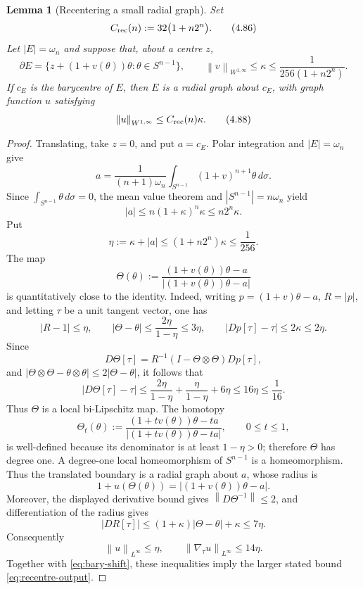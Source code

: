 \documentclass[11pt]{amsart}
\newtheorem{lemma}[theorem]{Lemma}
\theoremstyle{definition}
\newcommand{\norm}[1]{\left\|#1\right\|}
\begin{document}
\begin{lemma}[Recentering a small radial graph]\label{lem:graph-recentre}
Set
\[
   C_{\rm rec}(n):=32\bigl(1+n2^n\bigr).
\tag{4.86}\label{eq:Crec}
\]
Let \(|E|=\omega_n\) and suppose that, about a centre \(z\),
\[
   \partial E=\{z+(1+v(\theta))\theta:\theta\in S^{n-1}\},
   \qquad
   \norm{v}_{W^{1,\infty}}\le\kappa
   \le\frac{1}{256(1+n2^n)}.
\tag{4.87}\label{eq:recentre-input}
\]
If \(c_E\) is the barycentre of \(E\), then \(E\) is a radial graph
about \(c_E\), with graph function \(u\) satisfying
\[
   \norm{u}_{W^{1,\infty}}
      \le C_{\rm rec}(n)\kappa.
\tag{4.88}\label{eq:recentre-output}
\]
\end{lemma}

\begin{proof}
Translating, take \(z=0\), and put \(a=c_E\).  Polar integration and
\(|E|=\omega_n\) give
\[
   a=\frac{1}{(n+1)\omega_n}
      \int_{S^{n-1}}(1+v)^{n+1}\theta\,d\sigma.
\]
Since \(\int_{S^{n-1}}\theta\,d\sigma=0\), the mean value theorem and
\(|S^{n-1}|=n\omega_n\) yield
\[
   |a|
   \le n(1+\kappa)^n\kappa
   \le n2^n\kappa.
\tag{4.89}\label{eq:bary-shift}
\]
Put
\[
   \eta:=\kappa+|a|
      \le(1+n2^n)\kappa\le\frac1{256}.
\]
The map
\[
   \Theta(\theta):=
   \frac{(1+v(\theta))\theta-a}
        {|(1+v(\theta))\theta-a|}
\]
is quantitatively close to the identity.  Indeed, writing
\(p=(1+v)\theta-a\), \(R=|p|\), and letting \(\tau\) be a unit tangent
vector, one has
\[
   |R-1|\le\eta,\qquad
   |\Theta-\theta|\le\frac{2\eta}{1-\eta}\le3\eta,\qquad
   |Dp[\tau]-\tau|\le2\kappa\le2\eta.
\]
Since
\[
   D\Theta[\tau]
      =R^{-1}(I-\Theta\otimes\Theta)Dp[\tau],
\]
and \(|\Theta\otimes\Theta-\theta\otimes\theta|
\le2|\Theta-\theta|\), it follows that
\[
   |D\Theta[\tau]-\tau|
   \le\frac{2\eta}{1-\eta}
       +\frac{\eta}{1-\eta}+6\eta
   \le16\eta\le\frac1{16}.
\]
Thus \(\Theta\) is a local bi-Lipschitz map.  The homotopy
\[
   \Theta_t(\theta):=
   \frac{(1+t v(\theta))\theta-ta}
        {|(1+t v(\theta))\theta-ta|},
   \qquad 0\le t\le1,
\]
is well-defined because its denominator is at least \(1-\eta>0\);
therefore \(\Theta\) has degree one.  A degree-one local
homeomorphism of \(S^{n-1}\) is a homeomorphism.  Thus the translated
boundary is a radial graph about \(a\), whose radius is
\[
   1+u(\Theta(\theta))
      =|(1+v(\theta))\theta-a|.
\]
Moreover, the displayed derivative bound gives
\(\norm{D\Theta^{-1}}\le2\), and differentiation of the radius gives
\[
   |D R[\tau]|
      \le (1+\kappa)|\Theta-\theta|+\kappa
      \le7\eta.
\]
Consequently
\[
   \norm{u}_{L^\infty}
      \le\eta,
   \qquad
   \norm{\nabla_\tau u}_{L^\infty}
      \le14\eta.
\]
Together with \eqref{eq:bary-shift}, these inequalities imply the
larger stated bound \eqref{eq:recentre-output}.
\end{proof}
\end{document}
